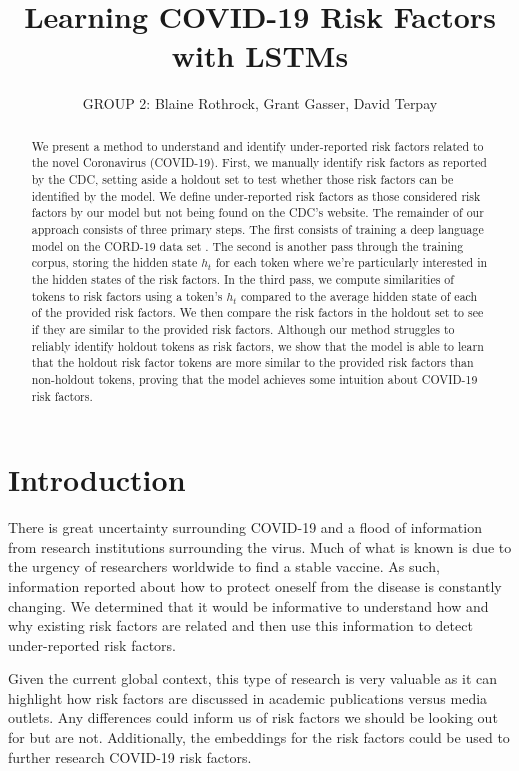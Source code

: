 \documentclass[11pt,a4paper]{article}
\title{Learning COVID-19 Risk Factors with LSTMs}
\author{GROUP 2: Blaine Rothrock,  Grant Gasser, David Terpay}
\date{}
\begin{document}
\maketitle
\begin{abstract}
We present a method to understand and identify under-reported risk factors related to the novel Coronavirus (COVID-19). First, we manually identify risk factors as reported by the CDC, setting aside a holdout set to test whether those risk factors can be identified by the model. We define under-reported risk factors as those considered risk factors by our model but not being found on the CDC's website. The remainder of our approach consists of three primary steps. The first consists of training a deep language model on the CORD-19 data set \cite{wang2020cord}. The second is another pass through the training corpus, storing the hidden state $h_t$ for each token where we’re particularly interested in the hidden states of the risk factors. In the third pass, we compute similarities of tokens to risk factors using a token's $h_t$ compared to the average hidden state of each of the provided risk factors. We then compare the risk factors in the holdout set to see if they are similar to the provided risk factors. Although our method struggles to reliably identify holdout tokens as risk factors, we show that the model is able to learn that the holdout risk factor tokens are more similar to the provided risk factors than non-holdout tokens, proving that the model achieves some intuition about COVID-19 risk factors.
\end{abstract}


\section{Introduction}

There is great uncertainty surrounding COVID-19 and a flood of information from research institutions surrounding the virus. Much of what is known is due to the urgency of researchers worldwide to find a stable vaccine. As such, information reported about how to protect oneself from the disease is constantly changing. We determined that it would be informative to understand how and why existing risk factors are related and then use this information to detect under-reported risk factors. 

Given the current global context, this type of research is very valuable as it can highlight how risk factors are discussed in academic publications versus media outlets. Any differences could inform us of risk factors we should be looking out for but are not. Additionally, the embeddings for the risk factors could be used to further research COVID-19 risk factors. 
\end{document}
